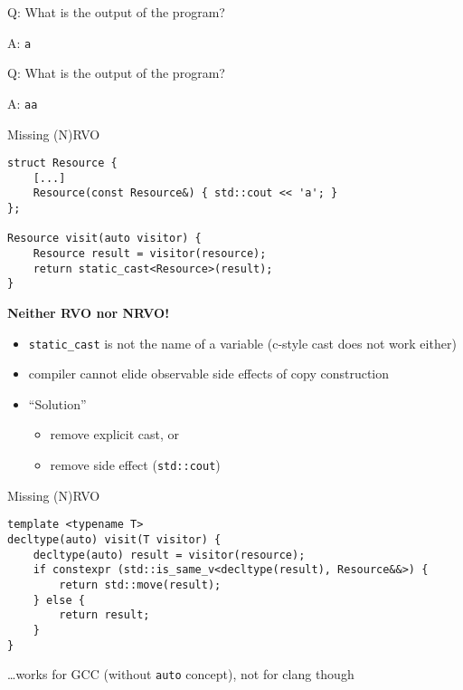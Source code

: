 \documentclass[compress,aspectratio=1610]{beamer}
\newcommand{\inputcpplisting}[1]{}
\begin{document}
\begin{frame}
    \centering
    \scalebox{5.}{\color{vertexDarkRed}$*$}
\end{frame}

\begin{frame}[fragile]{Q: What is the output of the program?}
    \inputcpplisting{snippet16a}
\end{frame}

\begin{frame}[fragile]{A: \texttt{a}}
    \inputcpplisting{snippet16a}
\end{frame}

\begin{frame}[fragile]{Q: What is the output of the program?}
    \inputcpplisting{snippet16b}
\end{frame}

\begin{frame}[fragile]{A: \texttt{aa}}
    \inputcpplisting{snippet16b}
\end{frame}

\begin{frame}[fragile]{Missing (N)RVO}
    \begin{lstlisting}
struct Resource {
    [...]
    Resource(const Resource&) { std::cout << 'a'; }
};

Resource visit(auto visitor) {
    Resource result = visitor(resource);
    return static_cast<Resource>(result);
}
    \end{lstlisting}

    \textbf{Neither RVO nor NRVO!}
    \begin{itemize}
        \item \texttt{static\_cast} is not the name of a variable (c-style cast does not work either)
        \item compiler cannot elide observable side effects of copy construction
        \item \enquote{Solution}
        \begin{itemize}
            \item remove explicit cast, or
            \item remove side effect (\texttt{std::cout})
        \end{itemize}
    \end{itemize}
\end{frame}

\begin{frame}[fragile]{Missing (N)RVO}
    \begin{lstlisting}
template <typename T>
decltype(auto) visit(T visitor) {
    decltype(auto) result = visitor(resource);
    if constexpr (std::is_same_v<decltype(result), Resource&&>) {
        return std::move(result);
    } else {
        return result;
    }
}
    \end{lstlisting}

    \hfill \ldots works for GCC (without \texttt{auto} concept), not for clang though
\end{frame}
\end{document}
